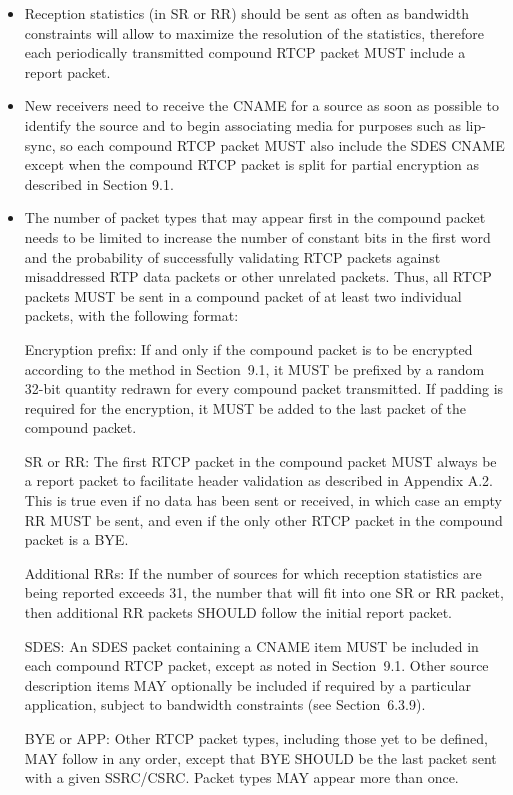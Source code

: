\documentclass{article}
\begin{document}
\begin{itemize}
\item Reception statistics (in SR or RR) should be sent as often as bandwidth constraints will allow to maximize the resolution of the statistics, therefore each periodically transmitted compound RTCP packet MUST include a report packet.
\item New receivers need to receive the CNAME for a source as soon as possible to identify the source and to begin associating media for purposes such as lip-sync, so each compound RTCP packet MUST also include the SDES CNAME except when the compound RTCP packet is split for partial encryption as described in Section 9.1.
\item The number of packet types that may appear first in the compound packet needs to be limited to increase the number of constant bits in the first word and the probability of successfully validating RTCP packets against misaddressed RTP data packets or other unrelated packets.
Thus, all RTCP packets MUST be sent in a compound packet of at least two individual packets, with the following format:

Encryption prefix:  If and only if the compound packet is to be encrypted according to the method in Section~9.1, it MUST be prefixed by a random 32-bit quantity redrawn for every compound packet transmitted.  If padding is required for the encryption, it MUST be added to the last packet of the compound packet.

SR or RR:  The first RTCP packet in the compound packet MUST always be a report packet to facilitate header validation as described in Appendix A.2.  This is true even if no data has been sent or received, in which case an empty RR MUST be sent, and even if the only other RTCP packet in the compound packet is a BYE.

Additional RRs:  If the number of sources for which reception statistics are being reported exceeds 31, the number that will fit into one SR or RR packet, then additional RR packets SHOULD follow the initial report packet.

SDES:  An SDES packet containing a CNAME item MUST be included in each compound RTCP packet, except as noted in Section~9.1. Other source description items MAY optionally be included if required by a particular application, subject to bandwidth constraints (see Section~6.3.9).

BYE or APP:  Other RTCP packet types, including those yet to be defined, MAY follow in any order, except that BYE SHOULD be the last packet sent with a given SSRC/CSRC.  Packet types MAY appear more than once.


\end{itemize}
\end{document}
